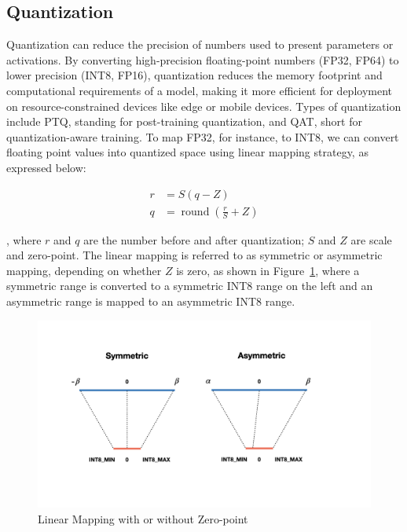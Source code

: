 \documentclass{article}
\begin{document}
    \subsection{Quantization}
    \hspace*{1em} Quantization can reduce the precision of numbers used to present parameters or activations. By converting high-precision floating-point numbers (FP32, FP64) to lower precision (INT8, FP16), quantization reduces the memory footprint and computational requirements of a model, making it more efficient for deployment on resource-constrained devices like edge or mobile devices. Types of quantization include PTQ, standing for post-training quantization, and QAT, short for quantization-aware training. To map FP32, for instance, to INT8, we can convert floating point values into quantized space using linear mapping strategy, as expressed below:


    \begin{align}
        r &= S(q-Z) \\
        q &= \operatorname{round}\left(\frac{r}{S} + Z\right)
    \end{align}

    , where $r$ and $q$ are the number before and after quantization; $S$ and $Z$ are scale and zero-point. The linear mapping is referred to as symmetric or asymmetric mapping, depending on whether $Z$ is zero, as shown in Figure~\ref{fig:sub4}, where a symmetric range is converted to a symmetric INT8 range on the left and an asymmetric range is mapped to an asymmetric INT8 range.

    \begin{figure}[hbpt]
        \centering
        \includegraphics[width=1\textwidth]{pics/pa/0.003}
        \caption{Linear Mapping with or without Zero-point}
        \label{fig:sub4}
    \end{figure}
\end{document}
